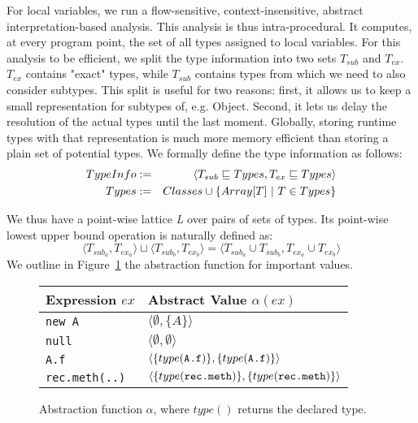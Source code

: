 For local variables, we run a flow-sensitive, context-insensitive, abstract
interpretation-based analysis. This analysis is thus intra-procedural. It
computes, at every program point, the set of all types assigned to local
variables. For this analysis to be efficient, we split the type information
into two sets $T_{sub}$ and $T_{ex}$.  $T_{ex}$ contains "exact" types, while
$T_{sub}$ contains types from which we need to also consider subtypes. This
split is useful for two reasons: first, it allows us to keep a small
representation for subtypes of, e.g. Object. Second, it lets us delay the
resolution of the actual types until the last moment.  Globally, storing
runtime types with that representation is much more memory efficient than
storing a plain set of potential types. We formally define the type information
as follows:
\begin{eqnarray*}
    TypeInfo &:=& \langle T_{sub} \sqsubseteq Types, T_{ex} \sqsubseteq Types\rangle \\
    Types    &:=& Classes \cup \{ Array[T] ~|~ T \in Types \} \\
\end{eqnarray*}

We thus have a point-wise lattice \emph{L} over pairs of sets of types. Its
point-wise lowest upper bound operation is naturally defined as:
$$
    \langle T_{sub_a}, T_{ex_a} \rangle \sqcup  \langle T_{sub_b}, T_{ex_b} \rangle =  \langle T_{sub_a} \cup T_{sub_b}, T_{ex_a} \cup T_{ex_b} \rangle
$$
We outline in Figure~\ref{fig:ta:tf} the abstraction function for important
values.
\begin{figure}[h]
    \centering

    \begin{tabular}{ l | l }
        Expression $ex$       & Abstract Value $\alpha(ex)$\\
        \hline
        \verb/new A/          & $\langle \emptyset, \{ A \} \rangle$ \\
        \verb/null/           & $\langle \emptyset, \emptyset \rangle$ \\
        \verb/A.f/            & $\langle\{type(\verb/A.f/)\}, \{type(\verb/A.f/)\} \rangle$ \\
        \verb/rec.meth(..)/   & $\langle\{type(\verb/rec.meth/)\}, \{type(\verb/rec.meth/)\} \rangle$ \\
    \end{tabular}

    \caption{Abstraction function $\alpha$, where $type()$ returns the declared
    type.}
    \label{fig:ta:tf}
\end{figure}

